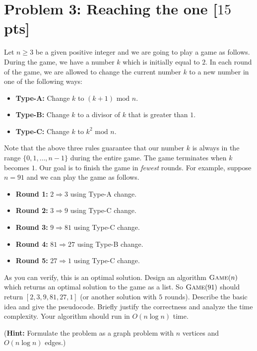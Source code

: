 \documentclass[11pt,twoside]{article}
\newcommand{\problem}[1]{\section*{Problem #1}}
\begin{document}
\problem{3: Reaching the one [$15$ pts]}
Let $n \geq 3$ be a given positive integer and we are going to play a game as follows.
During the game, we have a number $k$ which is initially equal to $2$.
In each round of the game, we are allowed to change the current number $k$ to a new number in one of the following ways:
\begin{itemize}
    \item \textbf{Type-A:} Change $k$ to $(k+1) \text{ mod } n$.
    \item \textbf{Type-B:} Change $k$ to a divisor of $k$ that is greater than $1$.
    \item \textbf{Type-C:} Change $k$ to $k^2 \text{ mod } n$.
\end{itemize}

Note that the above three rules guarantee that our number $k$ is always in the range $\{0,1,\dots,n-1\}$ during the entire game.
The game terminates when $k$ becomes $1$.
Our goal is to finish the game in \textit{fewest} rounds.
For example, suppose $n = 91$ and we can play the game as follows.
\begin{itemize}
    \item \textbf{Round 1:} $2 \Longrightarrow 3$ using Type-A change.
    \item \textbf{Round 2:} $3 \Longrightarrow 9$ using Type-C change.    
    \item \textbf{Round 3:} $9 \Longrightarrow 81$ using Type-C change.
    \item \textbf{Round 4:} $81 \Longrightarrow 27$ using Type-B change.
    \item \textbf{Round 5:} $27 \Longrightarrow 1$ using Type-C change.    
\end{itemize}
As you can verify, this is an optimal solution.
Design an algorithm $\textsc{Game}(n)$ which returns an optimal solution to the game as a list.
So $\textsc{Game}(91)$ should return $[2,3,9,81,27,1]$ (or another solution with $5$ rounds).
Describe the basic idea and give the pseudocode.
Briefly justify the correctness and analyze the time complexity.
Your algorithm should run in $O(n \log n)$ time.

(\textbf{Hint:} Formulate the problem as a graph problem with $n$ vertices and $O(n \log n)$ edges.)
\end{document}
